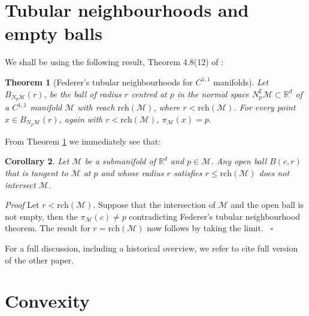 \documentclass{article}
\newenvironment{proof}[1][{}]{%
  \begin{trivlist}\item[]\textit{Proof #1}\quad}%
  {\hfill\hspace*{\fill}~$\square$\end{trivlist}}
\newtheorem{theorem}{Theorem}[section]
\newtheorem{corollary}[theorem]{Corollary}
\newcommand{\M}{\mathcal{M}}
\newcommand{\rch}{\mathrm{rch}}
\begin{document}
\section{Tubular neighbourhoods and empty balls} 
We shall be using the following result, Theorem 4.8(12) of \cite{federer1959}:
\begin{theorem}[Federer's tubular neighbourhoods for $C^{1,1}$ manifolds] \label{Theorem:TubularNeighbourhood}
Let $B_{N_p\M} (r)$, be the ball of radius $r$ centred at $p$ in the normal space $N_p^{\mathbb{E}}\M\subset \mathbb{R}^d$ of a $C^{1,1}$ manifold $\M$ with reach $\rch ( \M)$, where $r< \rch (\M)$. For every point $x \in B_{N_p\M} (r)$, again with $r< \rch (\M)$, $\pi_{\M}(x)=p$.
\end{theorem}

From Theorem \ref{Theorem:TubularNeighbourhood} we immediately see that: 
\begin{corollary}
\label{lem:medialball}
Let $\M$ be a submanifold of $\mathbb{R}^d$ and $p\in \M$. Any open ball $B(c,r)$ that is tangent to $\M$ at $p$ and whose radius $r$ satisfies $r\leq \rch (\M)$ does not intersect $\M$.
\end{corollary}
\begin{proof} Let $r < \rch (\M)$.
Suppose that the intersection of $\M$ and the open ball is not empty, then the $\pi_{\M}(c)\neq p$ contradicting Federer's tubular neighbourhood theorem. The result for $r=  \rch (\M)$ now follows by taking the limit.
\end{proof}

For a full discussion, including a historical overview, we refer to {\color{red} cite full version of the other paper}. 














\section{Convexity}
\end{document}
